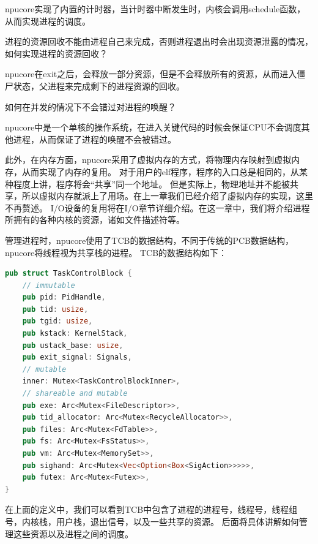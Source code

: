 npucore实现了内置的计时器，当计时器中断发生时，内核会调用schedule函数，从而实现进程的调度。

进程的资源回收不能由进程自己来完成，否则进程退出时会出现资源泄露的情况，如何实现进程的资源回收？

npucore在exit之后，会释放一部分资源，但是不会释放所有的资源，从而进入僵尸状态，父进程来完成剩下的进程资源的回收。

如何在并发的情况下不会错过对进程的唤醒？

npucore中是一个单核的操作系统，在进入关键代码的时候会保证CPU不会调度其他进程，从而保证了进程的唤醒不会被错过。

此外，在内存方面，npucore采用了虚拟内存的方式，将物理内存映射到虚拟内存，从而实现了内存的复用。
对于用户的elf程序，程序的入口总是相同的，从某种程度上讲，程序将会“共享”同一个地址。
但是实际上，物理地址并不能被共享，所以虚拟内存就派上了用场。在上一章我们已经介绍了虚拟内存的实现，这里不再赘述。
I/O设备的复用将在I/O章节详细介绍。在这一章中，我们将介绍进程所拥有的各种内核的资源，诸如文件描述符等。

管理进程时，npucore使用了TCB的数据结构，不同于传统的PCB数据结构，npucore将线程视为共享栈的进程。
TCB的数据结构如下：
\begin{lstlisting}[language=rust]
pub struct TaskControlBlock {
    // immutable
    pub pid: PidHandle,
    pub tid: usize,
    pub tgid: usize,
    pub kstack: KernelStack,
    pub ustack_base: usize,
    pub exit_signal: Signals,
    // mutable
    inner: Mutex<TaskControlBlockInner>,
    // shareable and mutable
    pub exe: Arc<Mutex<FileDescriptor>>,
    pub tid_allocator: Arc<Mutex<RecycleAllocator>>,
    pub files: Arc<Mutex<FdTable>>,
    pub fs: Arc<Mutex<FsStatus>>,
    pub vm: Arc<Mutex<MemorySet>>,
    pub sighand: Arc<Mutex<Vec<Option<Box<SigAction>>>>>,
    pub futex: Arc<Mutex<Futex>>,
}
\end{lstlisting}
在上面的定义中，我们可以看到TCB中包含了进程的进程号，线程号，线程组号，内核栈，用户栈，退出信号，以及一些共享的资源。
后面将具体讲解如何管理这些资源以及进程之间的调度。